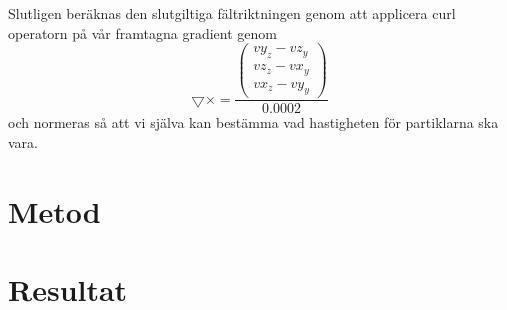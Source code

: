 \documentclass[a4paper]{article}
\begin{document}
Slutligen beräknas den slutgiltiga fältriktningen genom att applicera curl operatorn på vår framtagna gradient genom
\begin{equation}
\bigtriangledown \times =\frac{\begin{pmatrix}
vy_z - vz_y
\\ 
vz_z - vx_y
\\ 
vx_z - vy_y
\end{pmatrix}}{0.0002}
\end{equation}
och normeras så att vi själva kan bestämma vad hastigheten för partiklarna ska vara.

    \section{Metod}

    \section{Resultat}
\end{document}
